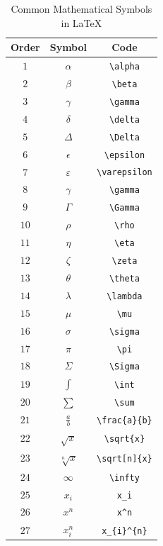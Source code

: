 \documentclass[12pt]{article}
\begin{document}
\begin{table}[t!]
\centering
\begin{tabular}{|c|c|c|}
\hline
Order & Symbol & Code \\
\hline
$1$ & $\alpha$ & \verb|\alpha| \\
\hline
$2$ & $\beta$ & \verb|\beta| \\
\hline
$3$ & $\gamma$ & \verb|\gamma| \\
\hline
$4$ & $\delta$ & \verb|\delta| \\
\hline
$5$ & $\Delta$ & \verb|\Delta| \\
\hline
$6$ & $\epsilon$ & \verb|\epsilon| \\
\hline
$7$ & $\varepsilon$ & \verb|\varepsilon| \\
\hline
$8$ & $\gamma$ & \verb|\gamma| \\
\hline
$9$ & $\Gamma$ & \verb|\Gamma| \\
\hline
$10$ & $\rho$ & \verb|\rho| \\
\hline
$11$ & $\eta$ & \verb|\eta| \\
\hline
$12$ & $\zeta$ & \verb|\zeta| \\
\hline
$13$ & $\theta$ & \verb|\theta| \\
\hline
$14$ & $\lambda$ & \verb|\lambda| \\
\hline
$15$ & $\mu$ & \verb|\mu| \\
\hline
$16$ & $\sigma$ & \verb|\sigma| \\
\hline
$17$ & $\pi$ & \verb|\pi| \\
\hline
$18$ & $\Sigma$ & \verb|\Sigma| \\
\hline
$19$ & $\int$ & \verb|\int| \\
\hline
$20$ & $\sum$ & \verb|\sum| \\
\hline
$21$ & $\frac{a}{b}$ & \verb|\frac{a}{b}| \\
\hline
$22$ & $\sqrt{x}$ & \verb|\sqrt{x}| \\
\hline
$23$ & $\sqrt[n]{x}$ & \verb|\sqrt[n]{x}| \\
\hline
$24$ & $\infty$ & \verb|\infty| \\
\hline
$25$ & $x_i$ & \verb|x_i| \\
\hline
$26$ & $x^n$ & \verb|x^n| \\
\hline
$27$ & $x_{i}^{n}$ & \verb|x_{i}^{n}| \\
\hline
\end{tabular}
\caption{Common Mathematical Symbols in \LaTeX}
\label{tab:common-math-symbols-1}
\end{table}
\end{document}
